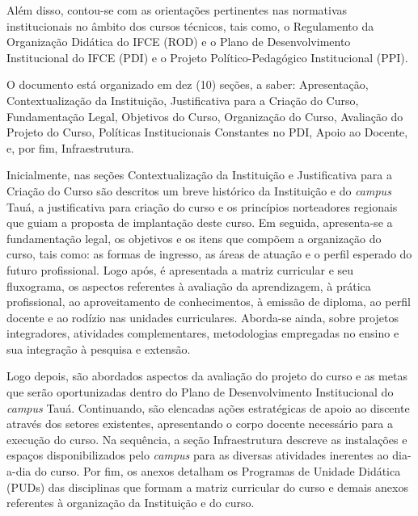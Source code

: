 \documentclass[
	12pt,				%
	openright,			%
	twoside,			%
	a4paper,			%
	chapter=TITLE,		%
	english,			%
	french,				%
	spanish,			%
	brazil,				%
	]{abntex2}
\begin{document}
 

 


 
 Além disso, contou-se com as orientações pertinentes nas normativas
 institucionais no âmbito dos cursos técnicos, tais como, o Regulamento da
 Organização Didática do IFCE (ROD) e  o Plano de Desenvolvimento Institucional
 do IFCE (PDI) e o Projeto Político-Pedagógico Institucional (PPI).
 

O documento está organizado em dez (10) seções, a saber: Apresentação, Contextualização da Instituição, Justificativa para a Criação do Curso, Fundamentação Legal, Objetivos do Curso, Organização do Curso, Avaliação do Projeto do Curso, Políticas Institucionais Constantes no PDI, Apoio ao Docente, e, por fim, Infraestrutura.


Inicialmente, nas seções Contextualização da Instituição e Justificativa para a Criação do Curso são descritos um breve histórico da Instituição e do \textit{campus} Tauá, a justificativa para criação do curso e os princípios norteadores regionais que guiam a proposta de implantação deste curso. Em seguida, apresenta-se a fundamentação legal, os objetivos e os itens que compõem a organização do curso, tais como: as formas de ingresso, as áreas de atuação e o perfil esperado do futuro profissional. Logo após, é apresentada a  matriz curricular e seu fluxograma, os aspectos referentes à avaliação da aprendizagem, à prática profissional, ao aproveitamento de conhecimentos, à emissão de diploma, ao perfil docente e ao rodízio nas unidades curriculares. Aborda-se ainda, sobre projetos integradores, atividades complementares, metodologias empregadas no ensino e sua integração \`a pesquisa e extensão.

Logo depois, são abordados aspectos  da avaliação do projeto do curso e as metas que serão oportunizadas dentro do Plano de Desenvolvimento Institucional do \textit{campus} Tauá. Continuando, são elencadas ações estratégicas de apoio ao discente através dos setores existentes, apresentando o corpo docente necessário para a execução do curso. Na sequência, a seção Infraestrutura descreve as instalações e espaços disponibilizados pelo \textit{campus} para as diversas atividades inerentes ao dia-a-dia do curso. Por fim, os anexos detalham os Programas de Unidade Didática (PUDs) das disciplinas que formam a matriz curricular do curso e demais anexos referentes à organização da Instituição e do curso.
\end{document}
